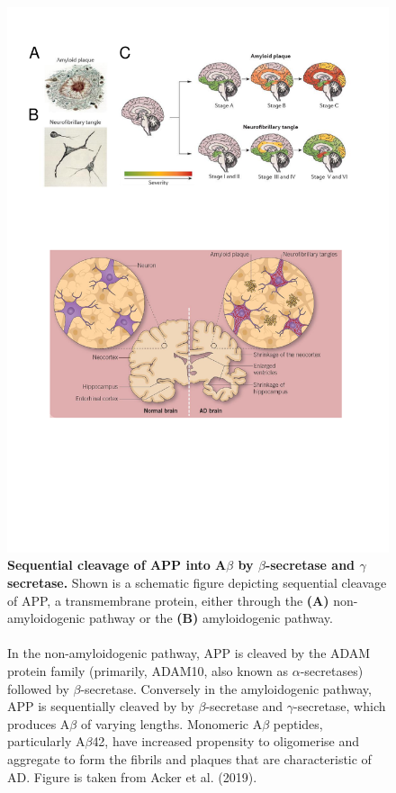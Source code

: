 \begin{figure}[!htp]
	\centering
	\includegraphics[page=2,trim={0.5cm 9cm 0cm 14.5cm},clip, scale = 0.8]{Figures/Introduction_Figures.pdf}
	\captionsetup{width=0.95\textwidth,singlelinecheck=off}
	\caption[Amyloid cascade hypothesis]%
	{\textbf{Sequential cleavage of APP into A$\beta$ by $\beta$-secretase and $\gamma$ secretase.} Shown is a schematic figure depicting sequential cleavage of APP, a transmembrane protein, either through the \textbf{(A)} non-amyloidogenic pathway or the \textbf{(B)} amyloidogenic pathway.
	\\
	\\
	In the non-amyloidogenic pathway, APP is cleaved by the ADAM protein family (primarily, ADAM10, also known as $\alpha$-secretases) followed by $\beta$-secretase. Conversely in the amyloidogenic pathway, APP is sequentially cleaved by by $\beta$-secretase and $\gamma$-secretase, which produces A$\beta$ of varying lengths. Monomeric A$\beta$ peptides, particularly A$\beta$42, have increased propensity to oligomerise and aggregate to form the fibrils and plaques that are characteristic of AD. Figure is taken from Acker et al. (2019)\cite{Acker2019}. 
	}
	\label{fig:APP_Processing}
\end{figure}

